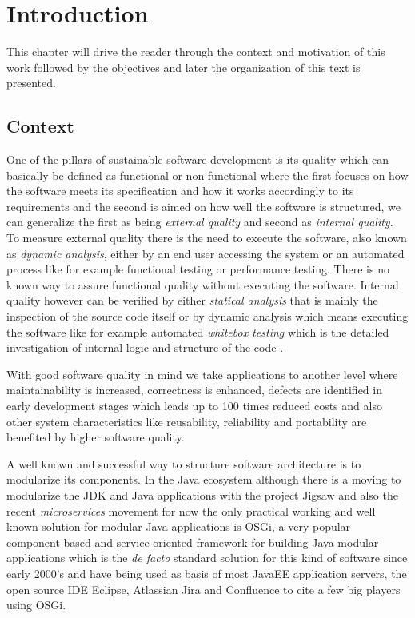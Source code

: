 \chapter{Introduction}
 This chapter will drive the reader through the context and motivation of this work followed by the objectives and later the organization of this text is presented.  
 

\section{Context}

One of the pillars of sustainable software development is its quality which can basically be defined as functional or non-functional where the first focuses on how the software meets its specification and how it works accordingly to its requirements and the second is aimed on how well the software is structured, we can generalize the first as being \emph{external quality} and second as \emph{internal quality}. To measure external quality there is the need to execute the software, also known as \emph{dynamic analysis}, either by an end user accessing the system or an automated process like for example functional testing or performance testing. There is no known way to assure functional quality without executing the software. Internal quality however can be verified by either \emph{statical analysis} that is mainly the inspection of the source code itself or by dynamic analysis which means executing the software like for example automated \emph{whitebox testing} which is the detailed
investigation of internal logic and structure of the code \citep{Khan 2012}.   

With good software quality in mind we take applications to another level where maintainability is increased, correctness is enhanced, defects are identified in early development stages which leads up to 100 times reduced costs \citep{Beohm 2001} and also other system characteristics like reusability, reliability and portability are benefited by higher software quality.  

A well known and successful way to structure software architecture is to modularize its components. In the Java ecosystem although there is a moving to modularize the JDK and Java applications with the project Jigsaw \citep{Krill 2012} and also the recent \emph{microservices} movement \citep{Knorr 2014} for now the only practical working and well known solution for modular Java applications is OSGi, a very popular component-based and service-oriented framework for building Java modular applications which is the \emph{de facto} standard solution for this kind of software since early 2000's and have being used as basis of most JavaEE application servers, the open source IDE Eclipse, Atlassian Jira and Confluence to cite a few big players using OSGi. 

